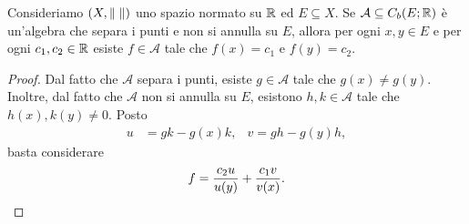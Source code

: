\begin{lemma}\label{tecnicoperSW}
Consideriamo $(X,\lVert\;\rVert)$ uno spazio normato su $\mathbb{R}$ ed $E \subseteq X$. Se $\mathcal{A} \subseteq C_b(E; \mathbb{R})$ è un'algebra che separa i punti e non si annulla su $E$, allora per ogni $x,y \in E$ e per ogni $c_1,c_2 \in \mathbb{R}$ esiste $f \in \mathcal{A}$ tale che $f(x) = c_1$ e $f(y) = c_2$.
\end{lemma}
\begin{proof}
Dal fatto che $\mathcal{A}$ separa i punti, esiste $g \in \mathcal{A}$ tale che $g(x) \ne g(y)$. Inoltre, dal fatto che $\mathcal{A}$ non si annulla su $E$, esistono $h,k \in \mathcal{A}$ tale che $h(x),k(y) \ne 0$. Posto
\begin{align*}
 u &= gk -g(x)k, & v= gh-g(y)h,
\end{align*}
basta considerare 
\[ f = \frac{c_2u}{u(y)} + \frac{c_1v}{v(x)}.\qedhere \]
\end{proof}

